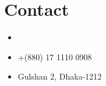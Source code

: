 \section{Contact}

\begin{itemize}
  \item

  \item
    +(880) 17 1110 0908

  \item
    Gulshan 2, Dhaka-1212
\end{itemize}
